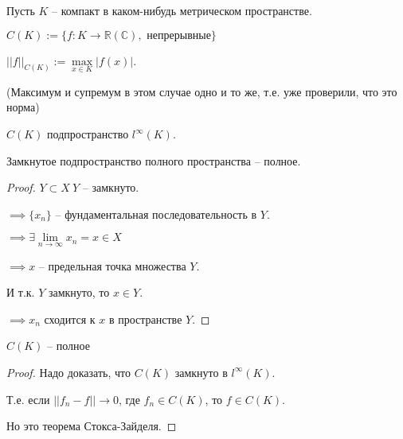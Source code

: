 \begin{definition}\slashns
	
	
	Пусть $K$ -- компакт в каком-нибудь метрическом пространстве. 
	
	$C(K):= \{f:K \to \mathbb{R}(\mathbb{C}) , \text{ непрерывные} \}$
	
	$||f||_{C(K)} := \max\limits_{x \in K} |f(x)|$.
	
	(Максимум и супремум в этом случае одно и то же, т.е. уже проверили, что это норма)
	
\end{definition}

\begin{remark}\slashns
	
	$C(K)$ подпространство $l^{\infty}(K)$.
\end{remark}

\begin{theorem}\slashns
	
	Замкнутое подпространство полного пространства -- полное.
\end{theorem}

\begin{proof}\slashns
	
	$Y \subset X \ Y$ -- замкнуто.
	
	$\implies \{x_n\}$ -- фундаментальная последовательность в $Y$.
	
	$\implies \exists \lim\limits_{n \to \infty} x_n = x \in  X$
	
	$\implies x$ -- предельная точка множества $Y$.
	
	И т.к. $Y$ замкнуто, то $x \in Y$.
	
	$\implies x_n$ сходится к $x$ в пространстве $Y$.
\end{proof}

\begin{consequence}\slashns
	
	$C(K)$ -- полное
\end{consequence}

\begin{proof}\slashns
	
	Надо доказать, что $C(K)$ замкнуто в $l^{\infty}(K)$.
	
	Т.е. если $||f_n - f|| \to 0$, где $f_n \in C(K)$, то $f \in C(K)$.
	
	Но это теорема Стокса-Зайделя.
\end{proof}

